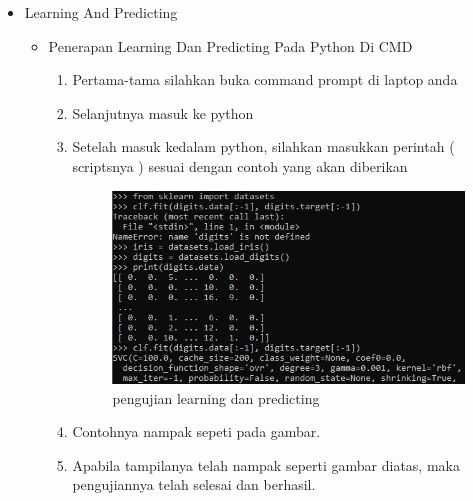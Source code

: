 \par
\par
\begin{itemize}
\item Learning And Predicting
\begin{itemize}
\item Penerapan Learning Dan Predicting Pada Python Di CMD
\begin{enumerate}
\item Pertama-tama silahkan buka command prompt di laptop anda
\item Selanjutnya masuk ke python 
\item Setelah masuk kedalam python, silahkan masukkan perintah ( scriptsnya ) sesuai dengan contoh yang akan diberikan

\begin{figure}[ht]
\centering
\includegraphics[scale=0.3]{figures/1.jpg}
\caption{pengujian learning dan predicting}
\label{contoh}
\end{figure}

\par
\item Contohnya nampak sepeti pada gambar.
\item Apabila tampilanya telah nampak seperti gambar diatas, maka pengujiannya telah selesai dan berhasil.
\end{enumerate}


\end{itemize}
\end{itemize}
